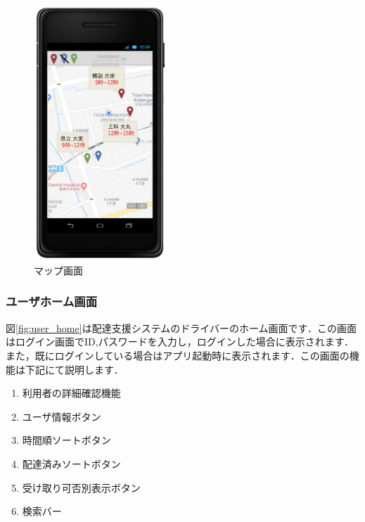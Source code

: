 \documentclass[a4j,titlepage]{jarticle}
\begin{document}
\begin{figure}[htbp]
 \begin{center}
  \includegraphics[width=50mm]{map}
	\caption{マップ画面}
	\label{fig:map}
 \end{center}

\end{figure}






\subsubsection{ユーザホーム画面}
図\ref{fig:user_home}は配達支援システムのドライバーのホーム画面です．この画面はログイン画面でID,パスワードを入力し，ログインした場合に表示されます．また，既にログインしている場合はアプリ起動時に表示されます．この画面の機能は下記にて説明します．
\begin{enumerate}
	\item 利用者の詳細確認機能\\

	\item ユーザ情報ボタン\\

	\item 時間順ソートボタン\\

	\item 配達済みソートボタン\\

	\item 受け取り可否別表示ボタン\\

	\item 検索バー\\

\end{enumerate}
\end{document}
